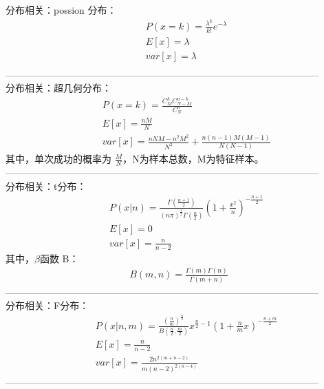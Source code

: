 \documentclass{article}
\begin{document}
\noindent 分布相关：possion 分布：\\
\begin{eqnarray*}
&&P(x=k)=\frac{\lambda^{k}}{k!}e^{-\lambda}\\
&&E[x]=\lambda\\
&&var[x]=\lambda\\
\end{eqnarray*}
--------------------------------------------------------------------------------------------------\\

\noindent 分布相关：超几何分布：\\
\begin{eqnarray*}
&&P(x=k) = \frac{C_{M}^{k}C_{N-M}^{n-k}}{C_{N}^{n}}\\
&&E[x] = \frac{nM}{N}\\
&&var[x] = \frac{nNM-n^{2}M^{2}}{N^{2}}+\frac{n(n-1)M(M-1)}{N(N-1)}
\end{eqnarray*}
其中，单次成功的概率为 $\frac{M}{N}$，N为样本总数，M为特征样本。\\
--------------------------------------------------------------------------------------------------\\

\noindent 分布相关：t分布：\\
\begin{eqnarray*}
&&P(x|n) = \frac{\Gamma(\frac{n+1}{2})}{(n\pi)^{\frac{1}{2}}\Gamma(\frac{n}{2})}(1+\frac{x^{2}}{n})^{-\frac{n+1}{2}}\\
&&E[x] = 0\\
&&var[x]=\frac{n}{n-2}
\end{eqnarray*}
其中，$\beta$函数 B：
\begin{eqnarray*}
B(m,n) = \frac{\Gamma(m)\Gamma(n)}{\Gamma(m+n)}
\end{eqnarray*}
--------------------------------------------------------------------------------------------------\\

\noindent 分布相关：F分布：\\
\begin{eqnarray*}
&&P(x|n,m)=\frac{(\frac{n}{m})^{\frac{n}{2}}}{B(\frac{n}{2}, \frac{m}{2})}x^{\frac{n}{2}-1}(1+\frac{n}{m}x)^{-\frac{n+m}{2}}\\
&&E[x]=\frac{n}{n-2}\\
&&var[x]=\frac{2n^{2(m+n-2)}}{m(n-2)^{2(n-4)}}
\end{eqnarray*}
--------------------------------------------------------------------------------------------------\\
\end{document}
